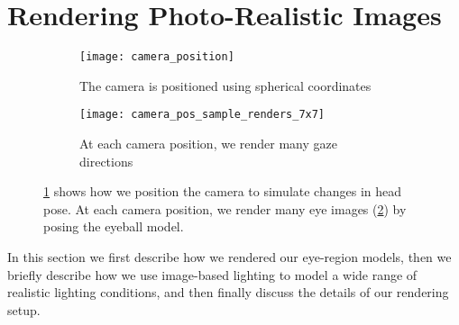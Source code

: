 
\section{Rendering Photo-Realistic Images}


\begin{figure}
    \centering
    \begin{subfigure}[t]{0.48\columnwidth}
        \texttt{[image: camera\_position]}
        \caption{The camera is positioned using spherical coordinates}
        \label{fig:cam_pos_spher_coords}
    \end{subfigure}
    \hfill
    \begin{subfigure}[t]{0.48\columnwidth}
        \texttt{[image: camera\_pos\_sample\_renders\_7x7]}
        \caption{At each camera position, we render many gaze directions}
        \label{fig:cam_pos_example_renders}
    \end{subfigure}
    \caption{\ref{fig:cam_pos_spher_coords} shows how we position the camera to simulate changes in head pose. At each camera position, we render many eye images (\ref{fig:cam_pos_example_renders}) by posing the eyeball model.}
    \label{fig:cam_pos}
\end{figure}

In this section we first describe how we rendered our eye-region models, then we briefly describe how we use image-based lighting \cite{debevec2002image} to model a wide range of realistic lighting conditions, and then finally discuss the details of our rendering setup.

